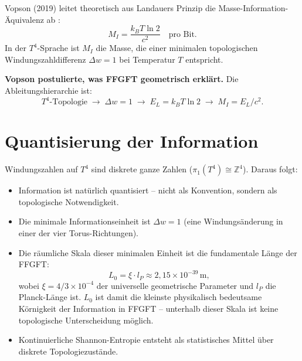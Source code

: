 Vopson (2019) leitet theoretisch aus Landauers Prinzip die
Masse-Information-Äquivalenz ab \cite{Vopson2019}:
\begin{equation}
  M_I = \frac{k_B T \ln 2}{c^2} \quad \text{pro Bit.}
  \label{eq:vopson}
\end{equation}
In der \(T^4\)-Sprache ist \(M_I\) die Masse,
die einer minimalen topologischen Windungszahldifferenz
\(\Delta w = 1\) bei Temperatur \(T\) entspricht.

\textbf{Vopson postulierte, was FFGFT geometrisch erklärt.}
Die Ableitungshierarchie ist:
\begin{equation}
  T^4\text{-Topologie} \;\longrightarrow\;
  \Delta w = 1 \;\longrightarrow\;
  E_L = k_B T \ln 2 \;\longrightarrow\;
  M_I = E_L / c^2.
\end{equation}

\section{Quantisierung der Information}

Windungszahlen auf \(T^4\) sind diskrete ganze Zahlen
(\(\pi_1(T^4) \cong \mathbb{Z}^4\)).
Daraus folgt:

\begin{itemize}
  \item Information ist natürlich quantisiert --
        nicht als Konvention, sondern als topologische Notwendigkeit.
  \item Die minimale Informationseinheit ist \(\Delta w = 1\)
        (eine Windungsänderung in einer der vier Torus-Richtungen).
  \item Die räumliche Skala dieser minimalen Einheit ist die
        fundamentale Länge der FFGFT:
        \begin{equation}
          L_0 = \xi \cdot l_P \approx 2{,}15 \times 10^{-39}\,\text{m},
        \end{equation}
        wobei \(\xi = 4/3 \times 10^{-4}\) der universelle geometrische
        Parameter und \(l_P\) die Planck-Länge ist.
        \(L_0\) ist damit die kleinste physikalisch bedeutsame
        Körnigkeit der Information in FFGFT -- unterhalb dieser
        Skala ist keine topologische Unterscheidung möglich.
  \item Kontinuierliche Shannon-Entropie entsteht als statistisches
        Mittel über diskrete Topologiezustände.
\end{itemize}

